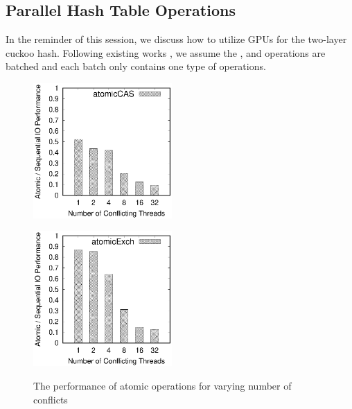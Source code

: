 \subsection{Parallel Hash Table Operations}\label{sec:vot:con}
In the reminder of this session, we discuss how to utilize GPUs for the two-layer cuckoo hash. Following existing works \cite{alcantara2009real,zhang2015mega,breslow2016horton}, we assume the ,  and  operations are batched and each batch only contains one type of operations. 

\begin{figure}[t]
	\centering
	\hspace{-3em}
	\begin{minipage}{0.5\linewidth}
		\label{fig:atomicCAS}
		\includegraphics[width=5.3cm]{exp/atomic/atomicCAS.eps}
	\end{minipage}
	\hspace{-1em}
	\begin{minipage}{0.5\linewidth}
		\label{fig:atomicExch}
		\includegraphics[width=5.3cm]{exp/atomic/atomicExch.eps}
	\end{minipage}
	\caption{The performance of atomic operations for varying number of conflicts}
	\label{fig:atomic}
\end{figure}

